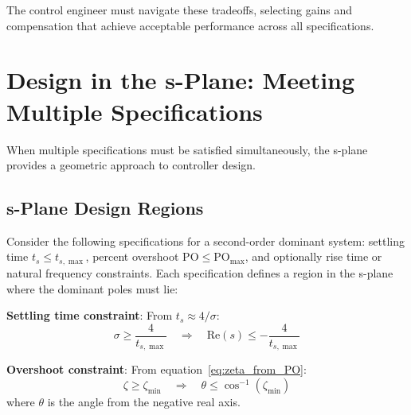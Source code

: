 The control engineer must navigate these tradeoffs, selecting gains and compensation that achieve acceptable performance across all specifications.

\section{Design in the s-Plane: Meeting Multiple Specifications}

When multiple specifications must be satisfied simultaneously, the s-plane provides a geometric approach to controller design.

\subsection{s-Plane Design Regions}

Consider the following specifications for a second-order dominant system: settling time $t_s \leq t_{s,\max}$, percent overshoot $\text{PO} \leq \text{PO}_{\max}$, and optionally rise time or natural frequency constraints. Each specification defines a region in the s-plane where the dominant poles must lie:

\textbf{Settling time constraint}: From $t_s \approx 4/\sigma$:
\begin{equation}
    \sigma \geq \frac{4}{t_{s,\max}} \quad \Rightarrow \quad \text{Re}(s) \leq -\frac{4}{t_{s,\max}}
\end{equation}

\textbf{Overshoot constraint}: From equation~\eqref{eq:zeta_from_PO}:
\begin{equation}
    \zeta \geq \zeta_{\min} \quad \Rightarrow \quad \theta \leq \cos^{-1}(\zeta_{\min})
\end{equation}
where $\theta$ is the angle from the negative real axis.

